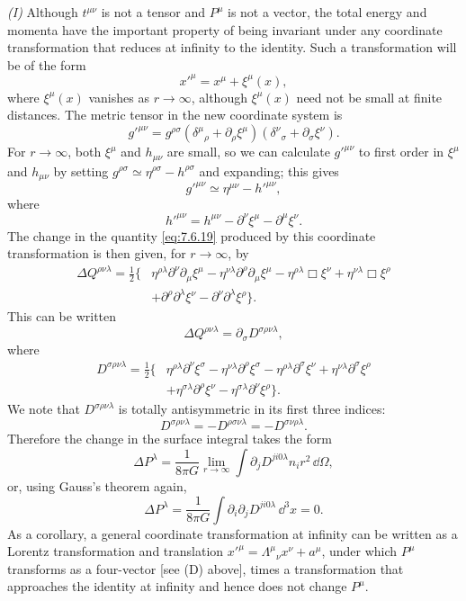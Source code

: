 \medskip
\noindent\textit{(I)} Although \(t^{\mu\nu}\) is not a tensor and
\(P^\mu\) is not a vector, the total energy and momenta have the important
property of being invariant under any coordinate transformation that
reduces at infinity to the identity. Such a transformation will be of the
form
\[
  x'^\mu=x^\mu+\xi^\mu(x),
\]
where \(\xi^\mu(x)\) vanishes as \(r\to\infty\), although
\(\xi^\mu(x)\) need not be small at finite distances. The metric tensor
in the new coordinate system is
\[
  g'^{\mu\nu}
  =
  g^{\rho\sigma}
  \left(\delta^\mu{}_\rho+\partial_\rho\xi^\mu\right)
  \left(\delta^\nu{}_\sigma+\partial_\sigma\xi^\nu\right).
\]
For \(r\to\infty\), both \(\xi^\mu\) and \(h_{\mu\nu}\) are small, so
we can calculate \(g'^{\mu\nu}\) to first order in \(\xi^\mu\) and
\(h_{\mu\nu}\) by setting \(g^{\rho\sigma}\simeq
\eta^{\rho\sigma}-h^{\rho\sigma}\) and expanding; this gives
\[
  g'^{\mu\nu}\simeq\eta^{\mu\nu}-h'^{\mu\nu},
\]
where
\[
  h'^{\mu\nu}
  =
  h^{\mu\nu}
  -\partial^\nu\xi^\mu
  -\partial^\mu\xi^\nu .
\]
The change in the quantity \eqref{eq:7.6.19} produced by this coordinate
transformation is then given, for \(r\to\infty\), by
\begin{align*}
  \Delta Q^{\rho\nu\lambda}
  =\frac12\bigl\{&
    \eta^{\rho\lambda}\partial^\nu\partial_\mu\xi^\mu
    -\eta^{\nu\lambda}\partial^\rho\partial_\mu\xi^\mu
    -\eta^{\rho\lambda}\Box\xi^\nu
    +\eta^{\nu\lambda}\Box\xi^\rho\\
    &+\partial^\rho\partial^\lambda\xi^\nu
    -\partial^\nu\partial^\lambda\xi^\rho
  \bigr\}.
\end{align*}
This can be written
\[
  \Delta Q^{\rho\nu\lambda}
  =
  \partial_\sigma D^{\sigma\rho\nu\lambda},
\]
where
\begin{align*}
  D^{\sigma\rho\nu\lambda}
  =\frac12\bigl\{&
    \eta^{\rho\lambda}\partial^\nu\xi^\sigma
    -\eta^{\nu\lambda}\partial^\rho\xi^\sigma
    -\eta^{\rho\lambda}\partial^\sigma\xi^\nu
    +\eta^{\nu\lambda}\partial^\sigma\xi^\rho\\
    &+\eta^{\sigma\lambda}\partial^\rho\xi^\nu
    -\eta^{\sigma\lambda}\partial^\nu\xi^\rho
  \bigr\}.
\end{align*}
We note that \(D^{\sigma\rho\nu\lambda}\) is totally antisymmetric in its
first three indices:
\[
  D^{\sigma\rho\nu\lambda}
  =
  -D^{\rho\sigma\nu\lambda}
  =
  -D^{\sigma\nu\rho\lambda}.
\]
Therefore the change in the surface integral takes the form
\[
  \Delta P^\lambda
  =
  \frac{1}{8\pi G}
  \lim_{r\to\infty}
  \int
  \partial_jD^{ji0\lambda}n_i r^2\,\dd\Omega,
\]
or, using Gauss's theorem again,
\begin{equation}
  \Delta P^\lambda
  =
  \frac{1}{8\pi G}
  \int
  \partial_i\partial_jD^{ji0\lambda}\,\dd^3x
  =0.
  \tag{7.6.25}\label{eq:7.6.25}
\end{equation}
As a corollary, a general coordinate transformation at infinity can be
written as a Lorentz transformation and translation
\(x'^\mu=\Lambda^\mu{}_\nu x^\nu+a^\mu\), under which \(P^\mu\)
transforms as a four-vector [see (D) above], times a transformation that
approaches the identity at infinity and hence does not change \(P^\mu\).

